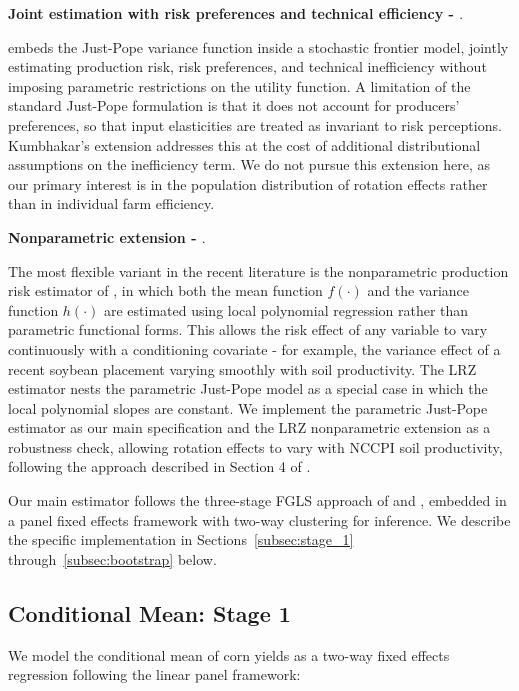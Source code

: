 \documentclass[12pt,letterpaper]{article}
\theoremstyle{remark}
\theoremstyle{remark}
\theoremstyle{plain}
\theoremstyle{definition}
\begin{document}
\medskip\noindent\textbf{Joint estimation with risk preferences and technical efficiency - \cite{Kumbhakar2002}}.

\cite{Kumbhakar2002} embeds the Just-Pope variance function inside a stochastic frontier model, jointly estimating production risk, risk preferences, and technical inefficiency without imposing parametric restrictions on the utility function. A limitation of the standard Just-Pope formulation is that it does not account for producers' preferences, so that input elasticities are treated as invariant to risk perceptions. Kumbhakar's extension addresses this at the cost of additional distributional assumptions on the inefficiency term. We do not pursue this extension here, as our primary interest is in the population distribution of rotation effects rather than in individual farm efficiency.

\medskip\noindent\textbf{Nonparametric extension - \cite{li2021}}.

The most flexible variant in the recent literature is the nonparametric production risk estimator of \cite{li2021}, in which both the mean function $f(\cdot)$ and the variance function $h(\cdot)$ are estimated using local polynomial regression rather than parametric functional forms. This allows the risk effect of any variable to vary continuously with a conditioning covariate - for example, the variance effect of a recent soybean placement varying smoothly with soil productivity. The LRZ estimator nests the parametric Just-Pope model as a special case in which the local polynomial slopes are constant. We implement the parametric Just-Pope estimator as our main specification and the LRZ nonparametric extension as a robustness check, allowing rotation effects to vary with NCCPI soil productivity, following the approach described in Section 4 of \cite{li2021}.

Our main estimator follows the three-stage FGLS approach of \cite{Harvey1976} and \cite{Saha1997}, embedded in a panel fixed effects framework with two-way clustering for inference. We describe the specific implementation in Sections~\ref{subsec:stage_1} through~\ref{subsec:bootstrap} below.

\subsection{\label{subsec:stage_1}Conditional Mean: Stage 1}
We model the conditional mean of corn yields as a two-way fixed effects regression following the linear panel framework:
\end{document}

